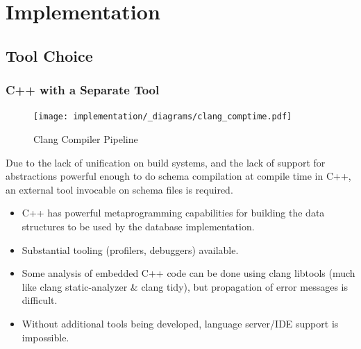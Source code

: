 \chapter{Implementation}

\section{Tool Choice}
\label{sec:tool_choice}

\subsection{C++ with a Separate Tool}
\begin{figure}[h!]
    \centering
    \texttt{[image: implementation/\_diagrams/clang\_comptime.pdf]}
    \caption{Clang Compiler Pipeline}
\end{figure}
\noindent
Due to the lack of unification on build systems, and the lack of support for abstractions powerful enough to do schema compilation at compile time in C++, an external tool invocable on schema files is required.
\begin{itemize}
    \setlength\itemsep{0em}
    \item C++ has powerful metaprogramming capabilities for building the data structures to be used by the database implementation.
    \item Substantial tooling (profilers, debuggers) available.
    \item Some analysis of embedded C++ code can be done using clang libtools (much like clang static-analyzer \& clang tidy), but propagation of error messages is difficult.
    \item Without additional tools being developed, language server/IDE support is impossible.
\end{itemize}

